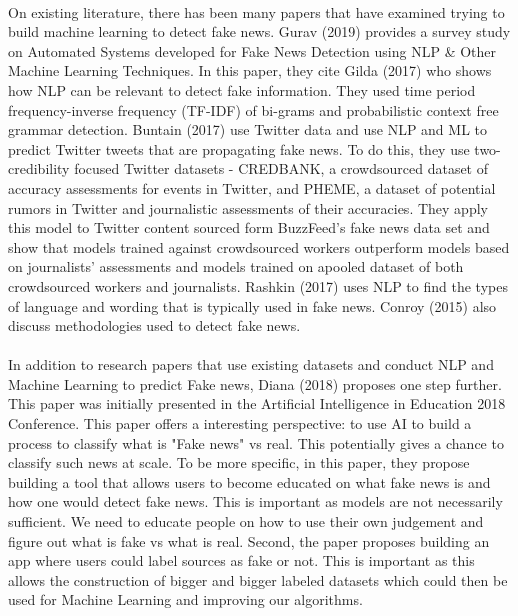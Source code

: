 \documentclass[12pt, final]{article}
\begin{document}
\\
On existing literature, there has been many papers that have examined trying to build machine learning to detect fake news. Gurav (2019) \cite{Gurav} provides a survey study on Automated Systems developed for Fake News Detection using NLP \& Other Machine Learning Techniques. In this paper, they cite Gilda (2017) \cite{Gilda} who shows how NLP can be relevant to detect fake information. They used time period frequency-inverse frequency (TF-IDF) of bi-grams and probabilistic context free grammar detection. Buntain (2017) \cite{Buntain} use Twitter data and use NLP and ML to predict Twitter tweets that are propagating fake news. To do this, they use two-credibility focused Twitter datasets - CREDBANK, a crowdsourced dataset of accuracy assessments for events in Twitter, and PHEME, a dataset of potential rumors in Twitter and journalistic assessments of their accuracies. They apply this model to Twitter content sourced form BuzzFeed's fake news data set and show that models trained against crowdsourced workers outperform models based on journalists' assessments and models trained on apooled dataset of both crowdsourced workers and journalists. Rashkin (2017) \cite{Rashkin} uses NLP to find the types of language and wording that is typically used in fake news. Conroy (2015) \cite{Conroy} also discuss methodologies used to detect fake news.
\\
\\
In addition to research papers that use existing datasets and conduct NLP and Machine Learning to predict Fake news, Diana (2018)  \cite{Diana} proposes one step further. This paper was initially presented in the Artificial Intelligence in Education 2018 Conference.  This paper offers a interesting perspective: to use AI to build a process to classify what is "Fake news" vs real. This potentially gives a chance to classify such news at scale. To be more specific, in this paper, they propose building a tool that allows users to become educated on what fake news is and how one would detect fake news. This is important as models are not necessarily sufficient. We need to educate people on how to use their own judgement and figure out what is fake vs what is real. Second, the paper proposes building an app where users could label sources as fake or not. This is important as this allows the construction of bigger and bigger labeled datasets which could then be used for Machine Learning and improving our algorithms. 
\\
\\
\end{document}
